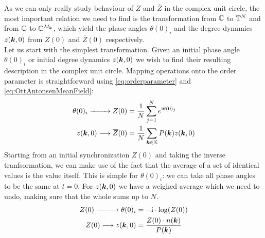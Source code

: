 
As we can only really study behaviour of $Z$ and $\overline{Z}$ in the complex unit circle, the most important relation we need to find is the transformation from ${\mathbb{C}}$ to ${\mathbb{T}}^{N}$ and from ${\mathbb{C}}$ to ${\mathbb{C}}^{M_{{\boldsymbol{k}}}}$, which yield the phase angles $\theta(0)_i$ and the degree dynamics $z({\boldsymbol{k}},0)$ from $Z(0)$ and $\overline{Z}(0)$ respectively. \\

Let us start with the simplest transformation. Given an initial phase angle $\theta(0)_i$ or initial degree dynamics $z({\boldsymbol{k}}, 0)$ we wish to find their resulting description in the complex unit circle. Mapping operations onto the order parameter is straightforward using \eqref{eq:orderparameter} and \eqref{eq:OttAntonsenMeanField}:
\begin{align}
\theta(0)_i \xrightarrow{\hspace*{8mm}} Z(0) &= \frac{1}{N} \sum_{j=1}^N e^{{\rm{i}}\theta(0)_j} \label{eq:thetatoZ}\\
z({\boldsymbol{k}},0) \longrightarrow \overline{Z}(0) &= \frac{1}{N} \sum_{{\boldsymbol{k}} \in {\mathbb{K}}} P({\boldsymbol{k}}) z({\boldsymbol{k}}, 0)  \label{eq:ztoZ}
\end{align}
Starting from an initial synchronization $Z(0)$ and taking the inverse tranfsormation, we can make use of the fact that the average of a set of identical values is the value itself. This is simple for $\theta(0)_i$: we can take all phase angles to be the same at $t = 0$. For $z({\boldsymbol{k}},0)$ we have a weighed average which we need to undo, making sure that the whole sums up to $N$.
\begin{align}
Z(0) \xrightarrow{\hspace*{9mm}} \theta(0)_{i} &= -\ic \cdot \log \left( Z(0) \right)  \label{eq:Ztotheta} \\
Z(0) \longrightarrow z(\k,0) &= \frac{Z(0) \cdot n(\k)}{P(\k)} \label{eq:Ztoz}
\end{align}


